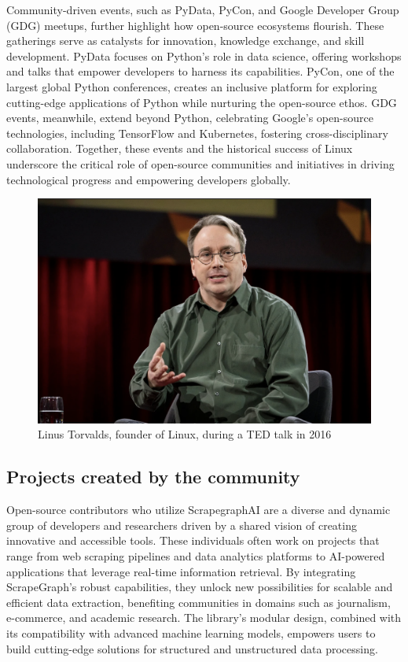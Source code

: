 Community-driven events, such as PyData, PyCon, and Google Developer Group (GDG) meetups, further highlight how open-source ecosystems flourish. These gatherings serve as catalysts for innovation, knowledge exchange, and skill development. PyData focuses on Python’s role in data science, offering workshops and talks that empower developers to harness its capabilities. PyCon, one of the largest global Python conferences, creates an inclusive platform for exploring cutting-edge applications of Python while nurturing the open-source ethos. GDG events, meanwhile, extend beyond Python, celebrating Google’s open-source technologies, including TensorFlow and Kubernetes, fostering cross-disciplinary collaboration. Together, these events and the historical success of Linux underscore the critical role of open-source communities and initiatives in driving technological progress and empowering developers globally.

\begin{figure}[H]
    \centering
    \includegraphics[width=0.5\linewidth]{Assets/torvalds.png}
    \caption{Linus Torvalds, founder of Linux, during a TED talk in 2016}
    \label{fig:enter-label}
\end{figure}

\subsection{Projects created by the community}
Open-source contributors who utilize ScrapegraphAI are a diverse and dynamic group of developers and researchers driven by a shared vision of creating innovative and accessible tools. These individuals often work on projects that range from web scraping pipelines and data analytics platforms to AI-powered applications that leverage real-time information retrieval. By integrating ScrapeGraph's robust capabilities, they unlock new possibilities for scalable and efficient data extraction, benefiting communities in domains such as journalism, e-commerce, and academic research. The library’s modular design, combined with its compatibility with advanced machine learning models, empowers users to build cutting-edge solutions for structured and unstructured data processing.

